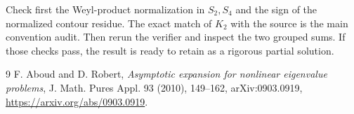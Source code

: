 \documentclass[11pt]{article}
\begin{document}
Check first the Weyl-product normalization in $S_2,S_4$ and the sign of the
normalized contour residue.  The exact match of $K_2$ with the source is the
main convention audit.  Then rerun the verifier and inspect the two grouped
sums.  If those checks pass, the result is ready to retain as a rigorous
partial solution.

\begin{thebibliography}{9}
F. Aboud and D. Robert,
\emph{Asymptotic expansion for nonlinear eigenvalue problems},
J. Math. Pures Appl. 93 (2010), 149--162,
arXiv:0903.0919, \url{https://arxiv.org/abs/0903.0919}.
\end{thebibliography}
\end{document}
